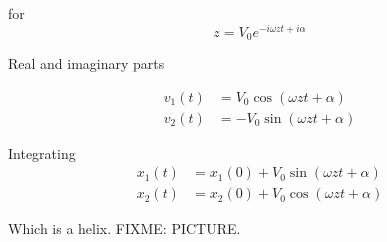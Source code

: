 for
\begin{equation}\label{eqn:relativisticElectrodynamicsT3:780}
z = V_0 e^{-i \omega z t + i \alpha}
\end{equation}

Real and imaginary parts

\begin{align}\label{eqn:relativisticElectrodynamicsT3:800}
v_1(t) &= V_0 \cos( \omega z t + \alpha) \\
v_2(t) &= -V_0 \sin( \omega z t + \alpha)
\end{align}

Integrating
\begin{align}\label{eqn:relativisticElectrodynamicsT3:820}
x_1(t) &= x_1(0) + V_0 \sin( \omega z t + \alpha) \\
x_2(t) &= x_2(0) + V_0 \cos( \omega z t + \alpha)
\end{align}

Which is a helix.
FIXME: PICTURE.

\EndNoBibArticle
